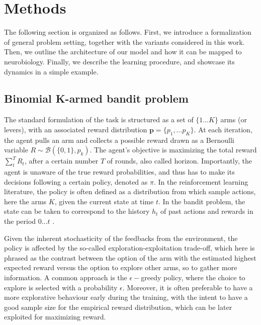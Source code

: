 

\section{Methods}

\noindent The following section is organized as follows. First, we introduce a formalization of general problem setting, together with the variants considered in this work. Then, we outline the architecture of our model and how it can be mapped to neurobiology. Finally, we describe the learning procedure,
and showcase its dynamics in a simple example.

\subsection{Binomial K-armed bandit problem}
\hfill \break
\noindent The standard formulation of the task is structured as a set of $\{1\dots K\}$ arms (or levers), with an associated reward distribution $\mathbf{p}=\{p_{1}, \ldots p_{K}\}$.
At each iteration, the agent pulls an arm and collects a possible reward drawn as a Bernoulli variable $R\sim \mathcal{B}(\{0,1\},p_{k})$. The agent's objective is maximizing the total reward $\sum^{T}_{t} R_{t}$, after a certain number $T$ of rounds, also called horizon.
Importantly, the agent is unaware of the true reward probabilities, and thus has to make its decisions following a certain policy, denoted as $\pi$.
In the reinforcement learning literature, the policy is often defined as a distribution from which sample actions, here the arms $K$, given the current state at time $t$. In the bandit problem, the state can be taken to correspond to the history $h_{t}$ of past actions and rewards in the period
$0\ldots t$ \cite{qiForcedExplorationBandit2023}.

Given the inherent stochasticity of the feedbacks from the environment, the policy is affected by the so-called exploration-exploitation trade-off, which here is phrased as the contrast between the option of the arm with the estimated highest expected reward versus the option to explore other arms, so to gather more information.
A common approach is the $\epsilon-$greedy policy, where the choice to explore is selected with a probability $\epsilon$.
Moreover, it is often preferable to have a more explorative behaviour early during the training, with the intent to have a good sample size for the empirical reward distribution, which can be later exploited for maximizing reward.

